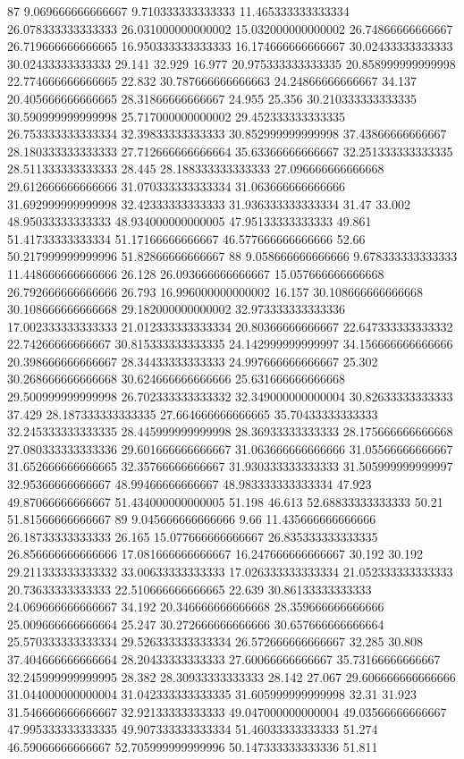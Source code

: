 87 9.069666666666667 9.710333333333333 11.465333333333334 26.078333333333333 26.031000000000002 15.032000000000002 26.74866666666667 26.719666666666665 16.950333333333333 16.174666666666667 30.02433333333333 30.02433333333333 29.141 32.929 16.977 20.975333333333335 20.858999999999998 22.774666666666665 22.832 30.787666666666663 24.24866666666667 34.137 20.405666666666665 28.31866666666667 24.955 25.356 30.210333333333335 30.590999999999998 25.717000000000002 29.452333333333335 26.753333333333334 32.39833333333333 30.852999999999998 37.43866666666667 28.180333333333333 27.712666666666664 35.63366666666667 32.251333333333335 28.511333333333333 28.445 28.188333333333333 27.096666666666668 29.612666666666666 31.070333333333334 31.063666666666666 31.692999999999998 32.42333333333333 31.936333333333334 31.47 33.002 48.95033333333333 48.934000000000005 47.95133333333333 49.861 51.41733333333334 51.17166666666667 46.577666666666666 52.66 50.217999999999996 51.82866666666667
88 9.058666666666666 9.678333333333333 11.448666666666666 26.128 26.093666666666667 15.057666666666668 26.792666666666666 26.793 16.996000000000002 16.157 30.108666666666668 30.108666666666668 29.182000000000002 32.973333333333336 17.002333333333333 21.012333333333334 20.80366666666667 22.647333333333332 22.74266666666667 30.815333333333335 24.142999999999997 34.156666666666666 20.398666666666667 28.34433333333333 24.997666666666667 25.302 30.268666666666668 30.624666666666666 25.631666666666668 29.500999999999998 26.702333333333332 32.349000000000004 30.82633333333333 37.429 28.187333333333335 27.664666666666665 35.70433333333333 32.245333333333335 28.445999999999998 28.36933333333333 28.175666666666668 27.080333333333336 29.601666666666667 31.063666666666666 31.05566666666667 31.652666666666665 32.35766666666667 31.930333333333333 31.505999999999997 32.95366666666667 48.99466666666667 48.983333333333334 47.923 49.87066666666667 51.434000000000005 51.198 46.613 52.68833333333333 50.21 51.81566666666667
89 9.045666666666666 9.66 11.435666666666666 26.18733333333333 26.165 15.077666666666667 26.835333333333335 26.856666666666666 17.081666666666667 16.247666666666667 30.192 30.192 29.211333333333332 33.00633333333333 17.026333333333334 21.052333333333333 20.73633333333333 22.510666666666665 22.639 30.86133333333333 24.069666666666667 34.192 20.346666666666668 28.359666666666666 25.009666666666664 25.247 30.272666666666666 30.657666666666664 25.570333333333334 29.526333333333334 26.572666666666667 32.285 30.808 37.404666666666664 28.20433333333333 27.60066666666667 35.73166666666667 32.245999999999995 28.382 28.30933333333333 28.142 27.067 29.606666666666666 31.044000000000004 31.042333333333335 31.605999999999998 32.31 31.923 31.546666666666667 32.92133333333333 49.047000000000004 49.03566666666667 47.995333333333335 49.907333333333334 51.46033333333333 51.274 46.59066666666667 52.705999999999996 50.147333333333336 51.811
